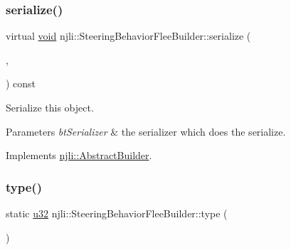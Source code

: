 \mbox{\label{classnjli_1_1_steering_behavior_flee_builder_a57e7bb2526150f02b68efbb9abb9fb50}} 
\subsubsection{\texorpdfstring{serialize()}{serialize()}}
{\footnotesize\ttfamily virtual \mbox{\hyperlink{_thread_8h_af1e856da2e658414cb2456cb6f7ebc66}{void}} njli\+::\+Steering\+Behavior\+Flee\+Builder\+::serialize (\begin{DoxyParamCaption}\item[{\mbox{\hyperlink{_thread_8h_af1e856da2e658414cb2456cb6f7ebc66}{void}} $\ast$}]{,  }\item[{bt\+Serializer $\ast$}]{ }\end{DoxyParamCaption}) const\hspace{0.3cm}{\ttfamily [virtual]}}

Serialize this object.


\begin{DoxyParams}{Parameters}
{\em bt\+Serializer} & the serializer which does the serialize. \\
\hline
\end{DoxyParams}


Implements \mbox{\hyperlink{classnjli_1_1_abstract_builder_ab66b774e02ccb9da554c9aab7fa6d981}{njli\+::\+Abstract\+Builder}}.

\mbox{\label{classnjli_1_1_steering_behavior_flee_builder_a6d1d2f808813c24e3b7c74aeb707adb5}} 
\subsubsection{\texorpdfstring{type()}{type()}}
{\footnotesize\ttfamily static \mbox{\hyperlink{_util_8h_a10e94b422ef0c20dcdec20d31a1f5049}{u32}} njli\+::\+Steering\+Behavior\+Flee\+Builder\+::type (\begin{DoxyParamCaption}{ }\end{DoxyParamCaption})\hspace{0.3cm}{\ttfamily [static]}}

